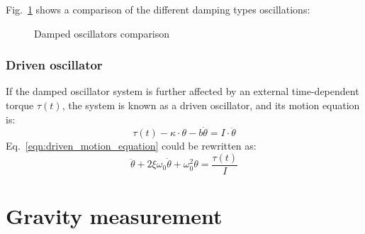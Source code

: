 \documentclass[\main/master.tex]{subfiles}
\begin{document}
\iffalse
\begin{equation}
\theta(t) = Ae^{-\frac{t}{\tau}(1+\sqrt{1-\frac{1}{\xi^2}})} + Be^{-\frac{t}{\tau}(1-\sqrt{1-\frac{1}{\xi^2}})}    \label{eqn:overdamped_motion_equation}
\end{equation}
\fi 
\par\noindent
Fig.~\ref{fig:damped_oscillators} shows a comparison of the different damping types oscillations:
\begin{figure}[htbp]
	\centering
	\caption[Damped oscillators comparison]{Damped oscillators comparison}
	\label{fig:damped_oscillators}
\end{figure}
\FloatBarrier
\iffalse
https://ocw.mit.edu/courses/mathematics/18-03sc-differential-equations-fall-2011/unit-ii-second-order-constant-coefficient-linear-equations/damped-harmonic-oscillators/MIT18_03SCF11_s13_2text.pdf

https://www.sciencedirect.com/topics/engineering/underdamped-system#:~:text=When%
\fi
\subsubsection{Driven oscillator}
If the damped oscillator system is further affected by an external time-dependent torque $\tau(t)$, the system is known as a driven oscillator, and its motion equation is:
\begin{equation}
\tau(t) -\kappa\cdot\theta - b\dot{\theta}  = I\cdot\ddot{\theta}   \label{eqn:driven_motion_equation}
\end{equation} 
Eq.~\ref{eqn:driven_motion_equation} could be rewritten as:
\begin{equation}
\ddot{\theta} + 2\xi\omega_0\dot{\theta} + \omega_0^2\theta = \frac{\tau(t)}{I}   \label{eqn:driven_motion_equation_2}
\end{equation}






\section{Gravity measurement}
\end{document}
